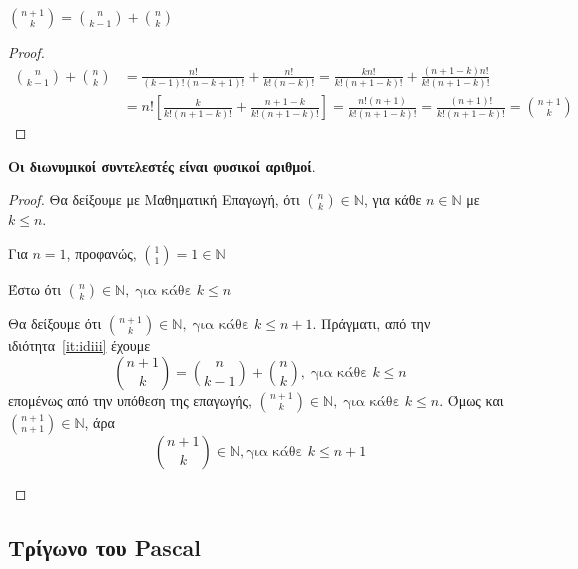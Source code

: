 \documentclass[a4paper,table]{report}
\begin{document}
\begin{enumerate}
  \item \label{it:idiii} 
    $ \binom{n+1}{k} = \binom{n}{k-1} + \binom{n}{k} $
    \begin{proof}
      \begin{align*}
        \binom{n}{k-1} + \binom{n}{k} 
        &= \frac{n!}{(k-1)!(n-k+1)!} + \frac{n!}{k!(n-k)!} 
        = \frac{kn!}{k!(n+1-k)!} + \frac{(n+1-k)n!}{k!(n+1-k)!} \\
        &= n! \left[\frac{k}{k!(n+1-k)!} + \frac{n+1-k}{k!(n+1-k)!}\right] 
        = \frac{n!(n+1)}{k!(n+1-k)!} = \frac{(n+1)!}{k!(n+1-k)!} = 
        \binom{n+1}{k}
      \end{align*} 
    \end{proof}

  \item \textbf{Οι διωνυμικοί συντελεστές είναι φυσικοί αριθμοί}.
    \begin{proof}
    \item {}
      Θα δείξουμε με Μαθηματική Επαγωγή, ότι $ \binom{n}{k} \in \mathbb{N} $,
      για κάθε $ n \in \mathbb{N} $ με $ k \leq n $.
      \begin{myitemize}
        \item Για $ n=1 $, προφανώς, $ \binom{1}{1} = 1 \in \mathbb{N} $
        \item Έστω ότι $ \binom{n}{k} \in \mathbb{N}, \; \text{για κάθε } k \leq n $
        \item Θα δείξουμε ότι $ \binom{n+1}{k} \in \mathbb{N}, \; \text{για κάθε } 
          k \leq n+1$. Πράγματι, από την ιδιότητα~\ref{it:idiii} έχουμε
          \[
            \binom{n+1}{k} = \binom{n}{k-1} + \binom{n}{k}, \; \text{για κάθε } 
            k \leq n
          \]
          επομένως από την υπόθεση της επαγωγής, $ \textstyle{\binom{n+1}{k}} \in
          \mathbb{N}, \; \text{για κάθε } k \leq n $. Όμως και 
          $ \textstyle{\binom{n+1}{n+1} \in \mathbb{N}} $, άρα 
          \[
            \binom{n+1}{k} \in \mathbb{N}, \text{για κάθε } k \leq n+1 
          \] 
      \end{myitemize}
    \end{proof}
\end{enumerate}

\enlargethispage{2\baselineskip}

\subsection*{Τρίγωνο του Pascal}
\end{document}
